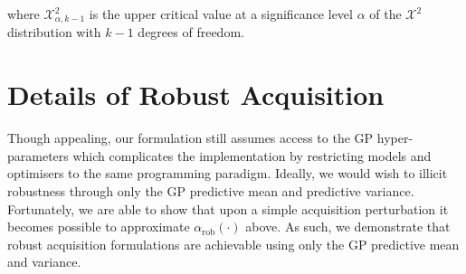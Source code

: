 \documentclass[jair,twoside,11pt,theapa]{article}
\theoremstyle{definition}
\begin{document}
\noindent where $\mathcal{X}^2_{\alpha, k-1}$ is the upper critical value at a significance level $\alpha$ of the $\mathcal{X}^2$ distribution with $k-1$ degrees of freedom.

\section{Details of Robust Acquisition}\label{app:robacq}


Though appealing, our formulation still assumes access to the GP hyper-parameters which complicates the implementation by restricting models and optimisers to the same programming paradigm. Ideally, we would wish to illicit robustness through only the GP predictive mean and predictive variance. Fortunately, we are able to show that upon a simple acquisition perturbation it becomes possible to approximate $\alpha_{\text{rob}}(\cdot)$ above. As such, we demonstrate that robust acquisition formulations are achievable using only the GP predictive mean and variance. \\ 
\end{document}
